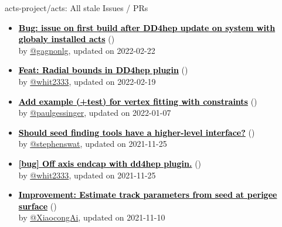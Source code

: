 \begin{frame}[allowframebreaks]{ acts-project/acts: All stale Issues / PRs}
\begin{itemize}
    \item\iss\prstale\textbf{\href{https://github.com/acts-project/acts/issues/1139}{\textcolor{black}{Bug: issue on first build after DD4hep update on system with globaly installed acts}}}
    (\href{https://github.com/acts-project/acts/issues/1139}{}) \\
    by \href{https://github.com/gagnonlg}{@gagnonlg}, updated on 2022-02-22

    \item\iss\prstale\textbf{\href{https://github.com/acts-project/acts/issues/822}{\textcolor{black}{Feat: Radial bounds in DD4hep plugin}}}
    (\href{https://github.com/acts-project/acts/issues/822}{}) \\
    by \href{https://github.com/whit2333}{@whit2333}, updated on 2022-02-19

    \item\iss\prstale\textbf{\href{https://github.com/acts-project/acts/issues/1100}{\textcolor{black}{Add example (+test) for vertex fitting with constraints}}}
    (\href{https://github.com/acts-project/acts/issues/1100}{}) \\
    by \href{https://github.com/paulgessinger}{@paulgessinger}, updated on 2022-01-07

    \item\iss\prstale\textbf{\href{https://github.com/acts-project/acts/issues/988}{\textcolor{black}{Should seed finding tools have a higher-level interface?}}}
    (\href{https://github.com/acts-project/acts/issues/988}{}) \\
    by \href{https://github.com/stephenswat}{@stephenswat}, updated on 2021-11-25

    \item\iss\prstale\textbf{\href{https://github.com/acts-project/acts/issues/942}{\textcolor{black}{[bug] Off axis endcap with dd4hep plugin.}}}
    (\href{https://github.com/acts-project/acts/issues/942}{}) \\
    by \href{https://github.com/whit2333}{@whit2333}, updated on 2021-11-25

    \item\iss\prstale\textbf{\href{https://github.com/acts-project/acts/issues/1036}{\textcolor{black}{Improvement: Estimate track parameters from seed at perigee surface}}}
    (\href{https://github.com/acts-project/acts/issues/1036}{}) \\
    by \href{https://github.com/XiaocongAi}{@XiaocongAi}, updated on 2021-11-10


\end{itemize}
\end{frame}

